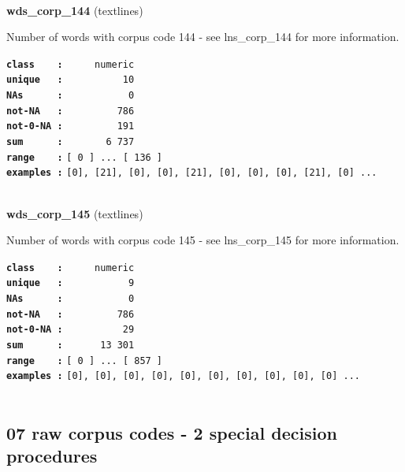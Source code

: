 \documentclass[]{article}
\begin{document}
~

\textbf{wds\_corp\_144} (textlines)

Number of words with corpus code 144 - see lns\_corp\_144 for more
information.

\textbf{\texttt{class\ \ \ \ :}} \texttt{~~~~~numeric}\\
\textbf{\texttt{unique\ \ \ :}} \texttt{~~~~~~~~~~10}\\
\textbf{\texttt{NAs\ \ \ \ \ \ :}} \texttt{~~~~~~~~~~~0}\\
\textbf{\texttt{not-NA\ \ \ :}} \texttt{~~~~~~~~~786}\\
\textbf{\texttt{not-0-NA\ :}} \texttt{~~~~~~~~~191}\\
\textbf{\texttt{sum\ \ \ \ \ \ :}} \texttt{~~~~~~~6~737}\\
\textbf{\texttt{range\ \ \ \ :}}
\texttt{{[}\ 0\ {]}\ ...\ {[}\ 136\ {]}}\\
\textbf{\texttt{examples\ :}}
\texttt{{[}0{]},\ {[}21{]},\ {[}0{]},\ {[}0{]},\ {[}21{]},\ {[}0{]},\ {[}0{]},\ {[}0{]},\ {[}21{]},\ {[}0{]}\ ...}\\

~

\textbf{wds\_corp\_145} (textlines)

Number of words with corpus code 145 - see lns\_corp\_145 for more
information.

\textbf{\texttt{class\ \ \ \ :}} \texttt{~~~~~numeric}\\
\textbf{\texttt{unique\ \ \ :}} \texttt{~~~~~~~~~~~9}\\
\textbf{\texttt{NAs\ \ \ \ \ \ :}} \texttt{~~~~~~~~~~~0}\\
\textbf{\texttt{not-NA\ \ \ :}} \texttt{~~~~~~~~~786}\\
\textbf{\texttt{not-0-NA\ :}} \texttt{~~~~~~~~~~29}\\
\textbf{\texttt{sum\ \ \ \ \ \ :}} \texttt{~~~~~~13~301}\\
\textbf{\texttt{range\ \ \ \ :}}
\texttt{{[}\ 0\ {]}\ ...\ {[}\ 857\ {]}}\\
\textbf{\texttt{examples\ :}}
\texttt{{[}0{]},\ {[}0{]},\ {[}0{]},\ {[}0{]},\ {[}0{]},\ {[}0{]},\ {[}0{]},\ {[}0{]},\ {[}0{]},\ {[}0{]}\ ...}\\

~

\subsection{07 raw corpus codes - 2 special decision
procedures}\label{raw-corpus-codes---2-special-decision-procedures}
\end{document}

